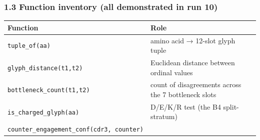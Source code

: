 \documentclass[12pt,a4paper]{article}
\begin{document}
\hypertarget{function-inventory-all-demonstrated-in-run-10}{%
\subsubsection{1.3 Function inventory (all demonstrated in run
10)}\label{function-inventory-all-demonstrated-in-run-10}}

\begin{longtable}[]{@{}ll@{}}
\toprule
\begin{minipage}[b]{0.47\columnwidth}\raggedright
Function\strut
\end{minipage} & \begin{minipage}[b]{0.47\columnwidth}\raggedright
Role\strut
\end{minipage}\tabularnewline
\midrule
\endhead
\begin{minipage}[t]{0.47\columnwidth}\raggedright
\texttt{tuple\_of(aa)}\strut
\end{minipage} & \begin{minipage}[t]{0.47\columnwidth}\raggedright
amino acid → 12-slot glyph tuple\strut
\end{minipage}\tabularnewline
\begin{minipage}[t]{0.47\columnwidth}\raggedright
\texttt{glyph\_distance(t1,t2)}\strut
\end{minipage} & \begin{minipage}[t]{0.47\columnwidth}\raggedright
Euclidean distance between ordinal values\strut
\end{minipage}\tabularnewline
\begin{minipage}[t]{0.47\columnwidth}\raggedright
\texttt{bottleneck\_count(t1,t2)}\strut
\end{minipage} & \begin{minipage}[t]{0.47\columnwidth}\raggedright
count of disagreements across the 7 bottleneck slots\strut
\end{minipage}\tabularnewline
\begin{minipage}[t]{0.47\columnwidth}\raggedright
\texttt{is\_charged\_glyph(aa)}\strut
\end{minipage} & \begin{minipage}[t]{0.47\columnwidth}\raggedright
D/E/K/R test (the B4 split-stratum)\strut
\end{minipage}\tabularnewline
\begin{minipage}[t]{0.47\columnwidth}\raggedright
\texttt{counter\_engagement\_conf(cdr3,\ counter)}\strut
\end{minipage} & \begin{minipage}[t]{0.47\columnwidth}\raggedright

\end{minipage}
\end{longtable}
\end{document}
